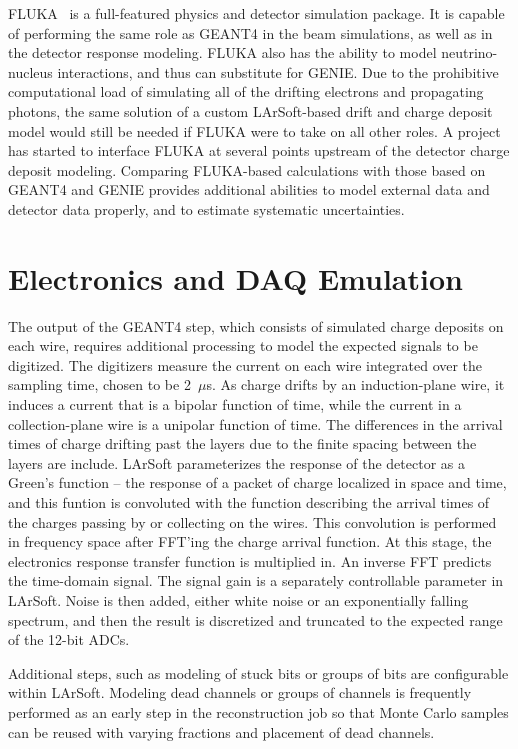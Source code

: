 FLUKA~\cite{FLUKA} is a full-featured physics and detector simulation package.  It is capable of
performing the same role as GEANT4 in the beam simulations, as well as in the detector response modeling.
FLUKA also has the ability to model neutrino-nucleus interactions, and thus can substitute for GENIE.
Due to the prohibitive computational load of simulating all of the drifting electrons and propagating
photons, the same solution of a custom LArSoft-based drift and charge deposit model would still be needed
if FLUKA were to take on all other roles.  A project has started to interface FLUKA at several points upstream
of the detector charge deposit modeling.  Comparing FLUKA-based calculations with those based on GEANT4 and
GENIE provides additional abilities to model external data and detector data properly, and to estimate
systematic uncertainties.

\section{Electronics and DAQ Emulation}

The output of the GEANT4 step, which consists of simulated charge deposits on each wire, requires
additional processing to model the expected signals to be digitized.  The digitizers measure the
current on each wire integrated over the sampling time, chosen to be 2~$\mu$s.  As charge drifts
by an induction-plane wire, it induces a current that is a bipolar function of time, while the
current in a collection-plane wire is a unipolar function of time.  The differences in the arrival
times of charge drifting past the layers due to the finite spacing between the layers are include.
LArSoft parameterizes the response
of the detector as a Green's function -- the response of a packet of charge localized in space and time,
and this funtion is convoluted with the function describing the arrival times of the charges passing by
or collecting on the wires.  This convolution is performed in frequency space after FFT'ing the charge
arrival function.  At this stage, the electronics response transfer function is multiplied in.  An inverse
FFT predicts the time-domain signal.  The signal gain is a separately controllable parameter in LArSoft.
  Noise is then added, either white noise or an exponentially falling
spectrum, and then the result is discretized and truncated to the expected range of the 12-bit ADCs.  

Additional steps, such as modeling of stuck bits or groups of bits are configurable within LArSoft.
Modeling dead channels or groups of channels is frequently performed as an early step
in the reconstruction job so that Monte Carlo samples can be reused with varying fractions and placement
of dead channels.

